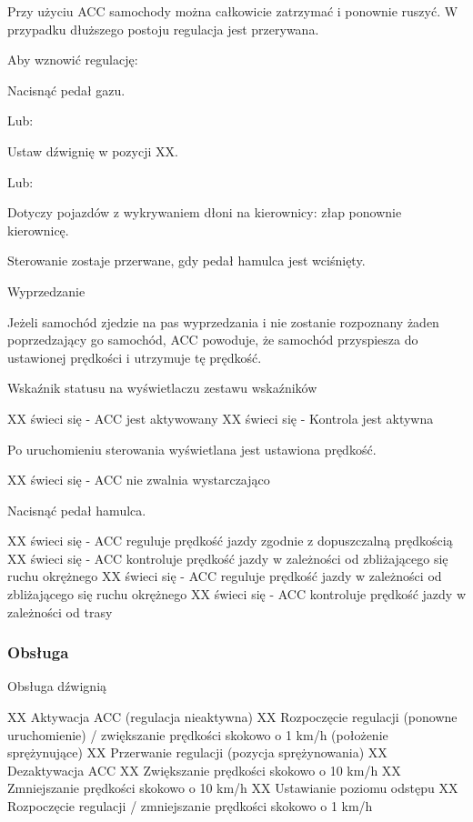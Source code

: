 Przy użyciu ACC samochody można całkowicie zatrzymać i ponownie ruszyć. W przypadku dłuższego postoju regulacja jest przerywana.

Aby wznowić regulację:
\begin{itemizeArrow}
	\itemArrow Nacisnąć pedał gazu.
\end{itemizeArrow}
Lub:
\begin{itemizeArrow}
	\itemArrow Ustaw dźwignię w pozycji XX.
\end{itemizeArrow}
Lub:
\begin{itemizeArrow}
	\itemArrow Dotyczy pojazdów z wykrywaniem dłoni na kierownicy: złap ponownie kierownicę.
\end{itemizeArrow}

Sterowanie zostaje przerwane, gdy pedał hamulca jest wciśnięty.

Wyprzedzanie

Jeżeli samochód zjedzie na pas wyprzedzania i nie zostanie rozpoznany żaden poprzedzający go samochód, ACC powoduje, że samochód przyspiesza do ustawionej prędkości i utrzymuje tę prędkość.

Wskaźnik statusu na wyświetlaczu zestawu wskaźników

XX świeci się - ACC jest aktywowany
XX świeci się - Kontrola jest aktywna

Po uruchomieniu sterowania wyświetlana jest ustawiona prędkość.

XX świeci się - ACC nie zwalnia wystarczająco
\begin{itemizeArrow}
	\itemArrow Nacisnąć pedał hamulca.
\end{itemizeArrow}
XX świeci się - ACC reguluje prędkość jazdy zgodnie z dopuszczalną prędkością
XX świeci się - ACC kontroluje prędkość jazdy w zależności od zbliżającego się ruchu okrężnego
XX świeci się - ACC reguluje prędkość jazdy w zależności od zbliżającego się ruchu okrężnego
XX świeci się - ACC kontroluje prędkość jazdy w zależności od trasy

\subsubsection{Obsługa}

Obsługa dźwignią


XX Aktywacja ACC (regulacja nieaktywna)
XX Rozpoczęcie regulacji (ponowne uruchomienie) / zwiększanie prędkości skokowo o 1 km/h (położenie sprężynujące)
XX Przerwanie regulacji (pozycja sprężynowania)
XX Dezaktywacja ACC
XX Zwiększanie prędkości skokowo o 10 km/h
XX Zmniejszanie prędkości skokowo o 10 km/h
XX Ustawianie poziomu odstępu
XX Rozpoczęcie regulacji / zmniejszanie prędkości skokowo o 1 km/h


